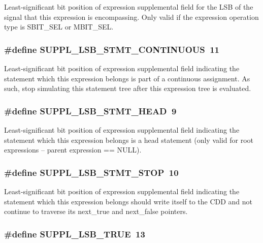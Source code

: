 Least-significant bit position of expression supplemental field for the LSB of the signal that this expression is encompassing. Only valid if the expression operation type is SBIT\_\-SEL or MBIT\_\-SEL. 
\subsubsection{\setlength{\rightskip}{0pt plus 5cm}\#define SUPPL\_\-LSB\_\-STMT\_\-CONTINUOUS\ 11}\label{group__expr__suppl_a5}


Least-significant bit position of expression supplemental field indicating the statement which this expression belongs is part of a continuous assignment. As such, stop simulating this statement tree after this expression tree is evaluated. 
\subsubsection{\setlength{\rightskip}{0pt plus 5cm}\#define SUPPL\_\-LSB\_\-STMT\_\-HEAD\ 9}\label{group__expr__suppl_a3}


Least-significant bit position of expression supplemental field indicating the statement which this expression belongs is a head statement (only valid for root expressions -- parent expression == NULL). 
\subsubsection{\setlength{\rightskip}{0pt plus 5cm}\#define SUPPL\_\-LSB\_\-STMT\_\-STOP\ 10}\label{group__expr__suppl_a4}


Least-significant bit position of expression supplemental field indicating the statement which this expression belongs should write itself to the CDD and not continue to traverse its next\_\-true and next\_\-false pointers. 
\subsubsection{\setlength{\rightskip}{0pt plus 5cm}\#define SUPPL\_\-LSB\_\-TRUE\ 13}\label{group__expr__suppl_a7}


